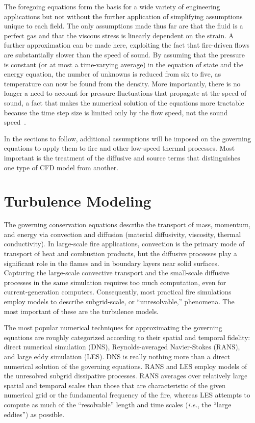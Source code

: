 \documentclass[graybox]{svmult}
\begin{document}
The foregoing equations form the basis for a wide variety of engineering applications but not without the further application of simplifying assumptions unique to each field. The only assumptions made thus far are that the fluid is a perfect gas and that the viscous stress is linearly dependent on the strain. A further approximation can be made here, exploiting the fact that fire-driven flows are substantially slower than the speed of sound. By assuming that the pressure is constant (or at most a time-varying average) in the equation of state and the energy equation, the number of unknowns is reduced from six to five, as temperature can now be found from the density. More importantly, there is no longer a need to account for pressure fluctuations that propagate at the speed of sound, a fact that makes the numerical solution of the equations more tractable because the time step size is limited only by the flow speed, not the sound speed~\cite{Rehm}.

In the sections to follow, additional assumptions will be imposed on the governing equations to apply them to fire and other low-speed thermal processes. Most important is the treatment of the diffusive and source terms that distinguishes one type of CFD model from another.


\section{Turbulence Modeling}

The governing conservation equations describe the transport of mass, momentum, and energy via convection and diffusion (material diffusivity, viscosity, thermal conductivity). In large-scale fire applications, convection is the primary mode of transport of heat and combustion products, but the diffusive processes play a significant role in the flames and in boundary layers near solid surfaces. Capturing the large-scale convective transport and the small-scale diffusive processes in the same simulation requires too much computation, even for current-generation computers. Consequently, most practical fire simulations employ models to describe subgrid-scale, or ``unresolvable,'' phenomena. The most important of these are the turbulence models.

The most popular numerical techniques for approximating the governing equations are roughly categorized according to their spatial and temporal fidelity: direct numerical simulation (DNS), Reynolds-averaged Navier-Stokes (RANS), and large eddy simulation (LES). DNS is really nothing more than a direct numerical solution of the governing equations. RANS and LES employ models of the unresolved subgrid dissipative processes. RANS averages over relatively large spatial and temporal scales than those that are characteristic of the given numerical grid or the fundamental frequency of the fire, whereas LES attempts to compute as much of the ``resolvable'' length and time scales ({\em i.e.}, the ``large eddies'') as possible.
\end{document}
